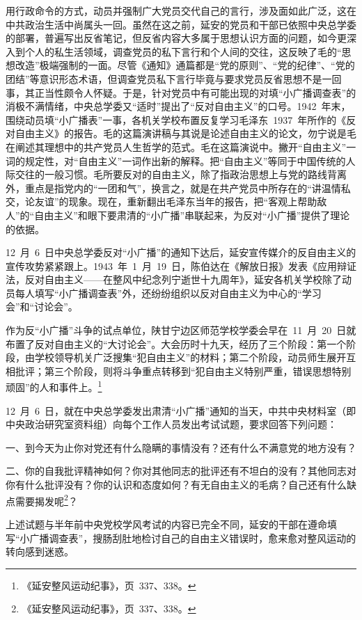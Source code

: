 用行政命令的方式，动员并强制广大党员交代自己的言行，涉及面如此广泛，这在中共政治生活中尚属头一回。虽然在这之前，延安的党员和干部已依照中央总学委的部署，普遍写出反省笔记，但反省内容大多属于思想认识方面的问题，如今更深入到个人的私生活领域，调查党员的私下言行和个人间的交往，这反映了毛的“思想改造”极端强制的一面。尽管《通知》通篇都是“党的原则”、“党的纪律”、“党的团结”等意识形态术语，但调查党员私下言行毕竟与要求党员反省思想不是一回事，其正当性颇令人怀疑。于是，针对党员中有可能出现的对填“小广播调查表”的消极不满情绪，中央总学委又“适时”提出了“反对自由主义”的口号。1942~年末，围绕动员填“小广播表”一事，各机关学校布置反复学习毛泽东~1937~年所作的《反对自由主义》的报告。毛的这篇演讲稿与其说是论述自由主义的论文，勿宁说是毛在阐述其理想中的共产党员人生哲学的范式。毛在这篇演说中。撇开“自由主义”一词的规定性，对“自由主义”一词作出新的解释。把“自由主义”等同于中国传统的人际交往的一般习惯。毛所要反对的自由主义，除了指政治思想上与党的路线背离外，重点是指党内的“一团和气”，换言之，就是在共产党员中所存在的“讲温情私交，论友谊”的现象。现在，重新翻出毛泽东当年的报告，把“客观上帮助敌人”的“自由主义”和眼下要肃清的“小广播”串联起来，为反对“小广播”提供了理论的依据。

12~月~6~日中央总学委反对“小广播”的通知下达后，延安宣传媒介的反自由主义的宣传攻势紧紧跟上。1943~年~1~月~19~日，陈伯达在《解放日报》发表《应用辩证法，反对自由主义——在整风中纪念列宁逝世十九周年》，延安各机关学校除了动员每人填写“小广播调查表”外，还纷纷组织以反对自由主义为中心的“学习会”和“讨论会”。

作为反“小广播”斗争的试点单位，陕甘宁边区师范学校学委会早在~11~月~20~日就布置了反对自由主义的“大讨论会”。大会历时十九天，经历了三个阶段：第一个阶段，由学校领导机关广泛搜集“犯自由主义”的材料；第二个阶段，动员师生展开互相批评；第三个阶段，则将斗争重点转移到“犯自由主义特别严重，错误思想特别顽固”的人和事件上。\footnote{《延安整风运动纪事》，页~337、338。}

12~月~6~日，就在中央总学委发出肃清“小广播”通知的当天，中共中央材料室（即中央政治研究室资料组）向每个工作人员发出考试试题，要求回答下列问题：

一、到今天为止你对党还有什么隐瞒的事情没有？还有什么不满意党的地方没有？

二、你的自我批评精神如何？你对其他同志的批评还有不坦白的没有？其他同志对你有什么批评没有？你的认识和态度如何？有无自由主义的毛病？自己还有什么缺点需要揭发呢\footnote{《延安整风运动纪事》，页~337、338。}？

上述试题与半年前中央党校学风考试的内容已完全不同，延安的干部在遵命填写“小广播调查表”，搜肠刮肚地检讨自己的自由主义错误时，愈来愈对整风运动的转向感到迷惑。

